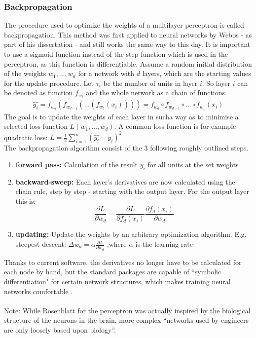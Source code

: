 \documentclass[11pt,a4paper]{article}
\begin{document}
\subsubsection{Backpropagation}
The procedure used to optimize the weights of a multilayer perceptron is called backpropagation. This method was first applied to neural networks by Webos - as part of his dissertation \cite{Werbos1974}- and still works the same way to this day. It is important to use a sigmoid function instead of the step function which is used in the perceptron, as this function is differentiable.  Assume a random initial distribution of the weights $w_1,\dots,w_d$ for a network with $d$ layers, which are the starting values for the update procedure. Let $\tau_i$ be the number of units in layer $i$. So layer $i$ can be denoted as function $f_{w_i}$ and the whole network as a chain of functions.
\begin{align}\label{network_chain}
	\hat{y_i}=f_{w_d}(f_{w_{d-1}}(...(f_{w_1}(x_i))))=f_{w_d}\circ f_{w_{d-1}} \circ \dots \circ f_{w_1}(x_i)
\end{align}
The goal is to update the weights of each layer in sucha way as to minimise a selected loss function $L(w_1,\dots,w_d)$. A common loss function is for example quadratic loss: $L=\frac{1}{2}\sum_{i=1}^n(\hat{y_i}-y_i)^2$\\
The backpropagation algorithm consist of the 3 following roughly outlined steps.
\begin{enumerate}
	\item \textbf{forward pass:} Calculation of the result $y_i$ for all units at the set weights
	\item \textbf{backward-sweep:} Each layer's derivatives are now calculated using the chain rule, step by step - starting with the output layer. For the output layer this is:
	\[\frac{\partial L}{\partial w_d}=\frac{\partial L}{\partial f_d(x_i)}\frac{\partial f_d(x_i)}{\partial w_d}	\]
	\item \textbf{updating:} Update the weights by an arbitrary optimization algorithm. E.g. steepest descent:
	$\Delta w_d=\alpha \frac{\partial L}{\partial w_d}$
	,where $\alpha$ is the learning rate
\end{enumerate}
Thanks to current software, the derivatives no longer have to be calculated for each node by hand, but the standard packages are capable of ``symbolic differentiation" for certain network structures, which makes training neural networks comfortable \cite[p. 47]{Chollet2018}.\\
\ \\
Note: While Rosenblatt for the perceptron was actually inspired by the biological structure of the neurons in the brain, more complex “networks used by engineers are only loosely based upon biology”\cite{Hecht-Nielsen1988}.
\end{document}
